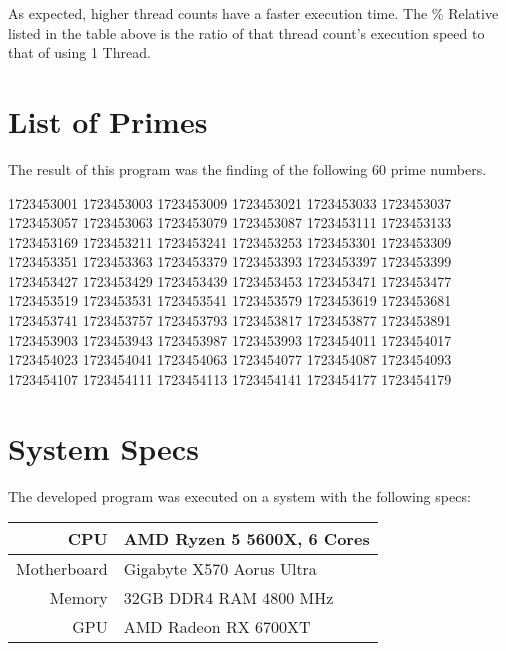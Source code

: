 \documentclass[12pt]{article}
\begin{document}
As expected, higher thread counts have a faster execution time.
The \% Relative listed in the table above is the ratio of that thread count's execution speed to that of using 1 Thread.

\section{List of Primes}

The result of this program was the finding of the following \textbf{\(60\)} prime numbers.

\begin{center}
    1723453001  1723453003  1723453009  1723453021  1723453033  1723453037 \\
    1723453057  1723453063  1723453079  1723453087  1723453111  1723453133 \\ 
    1723453169  1723453211  1723453241  1723453253  1723453301  1723453309 \\
    1723453351  1723453363  1723453379  1723453393  1723453397  1723453399 \\
    1723453427  1723453429  1723453439  1723453453  1723453471  1723453477 \\
    1723453519  1723453531  1723453541  1723453579  1723453619  1723453681 \\
    1723453741  1723453757  1723453793  1723453817  1723453877  1723453891 \\ 
    1723453903  1723453943  1723453987  1723453993  1723454011  1723454017 \\
    1723454023  1723454041  1723454063  1723454077  1723454087  1723454093 \\
    1723454107  1723454111  1723454113  1723454141  1723454177  1723454179 \\
\end{center}

\section{System Specs}

The developed program was executed on a system with the following specs:

\begin{center}
\begin{tabular}{| r | l |}
    \hline
    CPU & AMD Ryzen 5 5600X, 6 Cores \\ \hline
    Motherboard & Gigabyte X570 Aorus Ultra \\ \hline
    Memory & 32GB DDR4 RAM 4800 MHz \\ \hline
    GPU & AMD Radeon RX 6700XT \\ \hline
\end{tabular}
\end{center}
\end{document}
